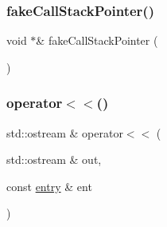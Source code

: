 \subsubsection{\texorpdfstring{fake\+Call\+Stack\+Pointer()}{fakeCallStackPointer()}}
{\footnotesize\ttfamily void $\ast$\& fake\+Call\+Stack\+Pointer (\begin{DoxyParamCaption}{ }\end{DoxyParamCaption})}

\mbox{\label{namespacestacktrace_a9cdc7f5a1e1c1f53958a3804334ae6c7}} 
\subsubsection{\texorpdfstring{operator$<$$<$()}{operator<<()}}
{\footnotesize\ttfamily std\+::ostream \& operator$<$$<$ (\begin{DoxyParamCaption}\item[{std\+::ostream \&}]{out,  }\item[{const \mbox{\hyperlink{structstacktrace_1_1entry}{entry}} \&}]{ent }\end{DoxyParamCaption})}

